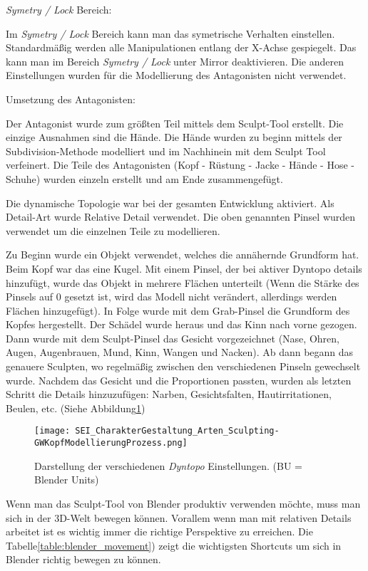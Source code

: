 \textit{Symetry / Lock} Bereich\citep{blender:sym_lock}:

Im \textit{Symetry / Lock} Bereich kann man das symetrische Verhalten einstellen. Standardmäßig werden alle
Manipulationen entlang der X-Achse gespiegelt. Das kann man im Bereich \textit{Symetry / Lock} unter Mirror
deaktivieren. Die anderen Einstellungen wurden für die Modellierung des Antagonisten nicht verwendet.



Umsetzung des Antagonisten:

Der Antagonist wurde zum größten Teil mittels dem Sculpt-Tool erstellt. Die einzige Ausnahmen sind die Hände. Die
Hände wurden zu beginn mittels der Subdivision-Methode modelliert und im Nachhinein mit dem Sculpt Tool verfeinert. Die Teile des
Antagonisten (Kopf - Rüstung - Jacke - Hände - Hose - Schuhe) wurden einzeln erstellt und am Ende zusammengefügt.

Die dynamische Topologie war bei der gesamten Entwicklung aktiviert. Als Detail-Art wurde Relative Detail
verwendet. Die oben genannten Pinsel wurden verwendet um die einzelnen Teile zu modellieren.

Zu Beginn wurde ein Objekt verwendet, welches die annähernde Grundform hat. Beim Kopf war das eine Kugel. Mit
einem Pinsel, der bei aktiver Dyntopo details hinzufügt, wurde das Objekt in mehrere Flächen unterteilt (Wenn die
Stärke des Pinsels auf 0 gesetzt ist, wird das Modell nicht verändert, allerdings werden Flächen hinzugefügt). In Folge
wurde mit dem Grab-Pinsel die Grundform des Kopfes hergestellt. Der Schädel wurde heraus und
das Kinn nach vorne gezogen. Dann wurde mit dem Sculpt-Pinsel das Gesicht vorgezeichnet (Nase, Ohren,
Augen, Augenbrauen, Mund, Kinn, Wangen und Nacken). Ab dann begann das genauere Sculpten, wo regelmäßig zwischen den
verschiedenen Pinseln gewechselt wurde. Nachdem das Gesicht und die Proportionen passten, wurden als letzten Schritt
die Details hinzuzufügen: Narben, Gesichtsfalten, Hautirritationen, Beulen, etc. (Siehe Abbildung\ref{picture:antagonist_process})

\begin{figure}[h]
    \centering
    \texttt{[image: SEI\_CharakterGestaltung\_Arten\_Sculpting-GWKopfModellierungProzess.png]}
    \caption{Darstellung der verschiedenen \textit{Dyntopo} Einstellungen. (BU = Blender Units)}
    \label{picture:antagonist_process}
\end{figure}

Wenn man das Sculpt-Tool von Blender produktiv verwenden möchte, muss man sich in der 3D-Welt bewegen
können. Vorallem wenn man mit relativen Details arbeitet ist es wichtig immer die richtige Perspektive zu erreichen.
Die Tabelle\ref{table:blender_movement}) zeigt die wichtigsten Shortcuts um sich in Blender richtig bewegen zu können.

